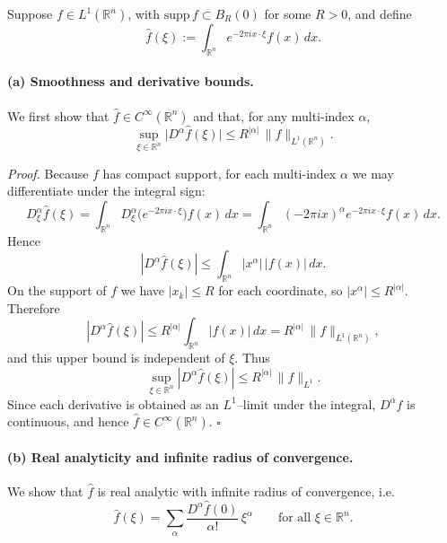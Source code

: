 \documentclass[12pt,a4paper]{article}
\newcommand{\qed}{\hfill$\square$}
\theoremstyle{plain}
\theoremstyle{definition}
\theoremstyle{remark}
\theoremstyle{remark}
\begin{document}
Suppose $f\in L^1(\mathbb{R}^n)$, with $\mathrm{supp}\,f\subset B_R(0)$ for some $R>0$,
and define
\[
\widehat f(\xi):=\int_{\mathbb{R}^n} e^{-2\pi i x\cdot \xi} f(x)\,dx.
\]

\paragraph{(a) Smoothness and derivative bounds.}

We first show that $\widehat f\in C^\infty(\mathbb{R}^n)$ and that, for any
multi-index $\alpha$,
\[
\sup_{\xi\in\mathbb{R}^n}\big|D^\alpha \widehat f(\xi)\big|
\le R^{|\alpha|}\,\|f\|_{L^1(\mathbb{R}^n)}.
\]

\emph{Proof.}
Because $f$ has compact support, for each multi-index $\alpha$ we may differentiate
under the integral sign:
\[
D^\alpha_\xi \widehat f(\xi)
= \int_{\mathbb{R}^n} D^\alpha_\xi\!\big(e^{-2\pi i x\cdot \xi}\big) f(x)\,dx
= \int_{\mathbb{R}^n} (-2\pi i x)^\alpha e^{-2\pi i x\cdot \xi} f(x)\,dx.
\]
Hence
\[
|D^\alpha \widehat f(\xi)|
\le \int_{\mathbb{R}^n} |x^\alpha|\,|f(x)|\,dx.
\]
On the support of $f$ we have $|x_k|\le R$ for each coordinate, so
$|x^\alpha|\le R^{|\alpha|}$. Therefore
\[
|D^\alpha \widehat f(\xi)|
\le R^{|\alpha|} \int_{\mathbb{R}^n}|f(x)|\,dx
= R^{|\alpha|}\,\|f\|_{L^1(\mathbb{R}^n)},
\]
and this upper bound is independent of $\xi$. Thus
\[
\sup_{\xi\in\mathbb{R}^n}|D^\alpha\widehat f(\xi)|
\le R^{|\alpha|}\,\|f\|_{L^1}.
\]
Since each derivative is obtained as an $L^1$–limit under the integral,
$D^\alpha\widehat f$ is continuous, and hence $\widehat f\in C^\infty(\mathbb{R}^n)$.
\qed

\paragraph{(b) Real analyticity and infinite radius of convergence.}

We show that $\widehat f$ is real analytic with infinite radius of convergence, i.e.
\[
\widehat f(\xi) = \sum_{\alpha} \frac{D^\alpha \widehat f(0)}{\alpha!}\,\xi^\alpha
\qquad\text{for all }\xi\in\mathbb{R}^n.
\]
\end{document}
